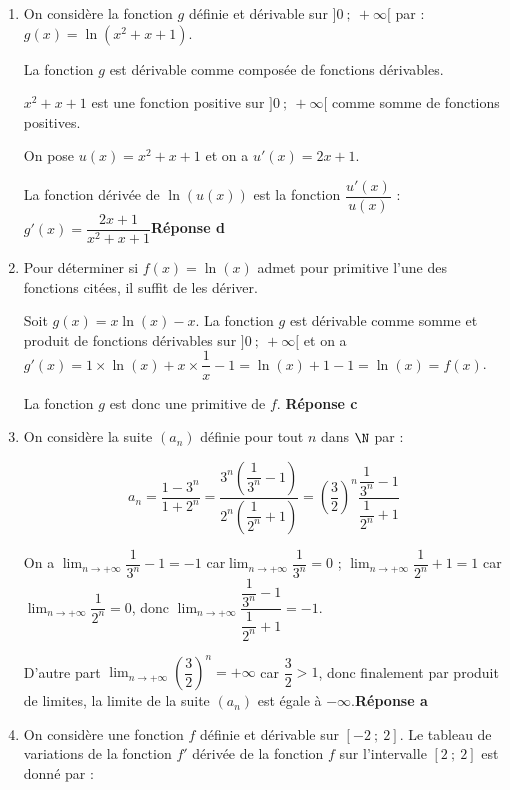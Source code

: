 \medskip







\begin{enumerate}
\item On considère  la fonction $g$ définie et dérivable sur $]0~;~+ \infty[$ par :
$g(x) = \ln \left(x^2 + x + 1\right).$

La fonction $g$ est dérivable comme composée de fonctions dérivables.

$x^2+x+1$ est une fonction positive sur $]0~;~+\infty[$ comme somme de fonctions positives.

On pose $u(x)=x^2+x+1$ et on a $u'(x)=2x+1$.

La fonction  dérivée de $\ln (u(x))$ est la fonction $\dfrac{u'(x)}{u(x)}$ : $g'(x) = \dfrac{2x + 1}{x^2 + x + 1}$\hfill\textbf{Réponse d}

\item 
Pour déterminer si $f(x)=\ln(x)$ admet pour primitive l'une des fonctions citées, il suffit de les dériver.

Soit $g(x) = x\ln (x)- x$.
La fonction $g$ est dérivable comme somme et produit de fonctions dérivables sur $]0~;~+ \infty[$ et on a $g'(x)=1\times \ln(x)+x\times \dfrac{1}{x} - 1= \ln (x) + 1- 1 = \ln(x) = f(x)$.

La fonction $g$ est donc une primitive de $f$. \hfill \textbf{Réponse c}

\item On considère la suite $\left(a_n\right)$ définie  pour tout $n$ dans $\N$ par :

\[a_n = \dfrac{1 - 3^n}{1 + 2^n}=\dfrac{3^n\left(\dfrac{1}{3^n}-1\right)}{2^n\left(\dfrac{1}{2^n}+1\right)}=\left(\dfrac{3}{2}\right)^n \dfrac{\dfrac{1}{3^n}-1}{\dfrac{1}{2^n}+1}\]

On a 
$\displaystyle\lim_{n \to + \infty} \dfrac{1}{3^n}-1=-1$ car$\displaystyle\lim_{n \to + \infty}\dfrac{1}{3^n}=0$ ; $\displaystyle\lim_{n \to + \infty} \dfrac{1}{2^n}+1=1$ car$\displaystyle\lim_{n \to + \infty}\dfrac{1}{2^n}=0$, donc $\displaystyle\lim_{n \to + \infty}\dfrac{\dfrac{1}{3^n} - 1}{\dfrac{1}{2^n} + 1} = - 1$.

D'autre part  $\displaystyle\lim_{n \to + \infty} \left(\dfrac{3}{2}\right)^n=+\infty$ car  $\dfrac{3}{2}> 1$, donc finalement par produit de limites, la limite de la suite $\left(a_n\right)$ est égale à $-\infty$.\hfill\textbf{Réponse a}

\item 
On considère une fonction $f$ définie et dérivable sur $[-2~;~2]$. Le tableau de variations de la fonction $f'$ dérivée de la fonction $f$ sur l'intervalle $[2~;~2]$ est donné par :


\end{enumerate}

